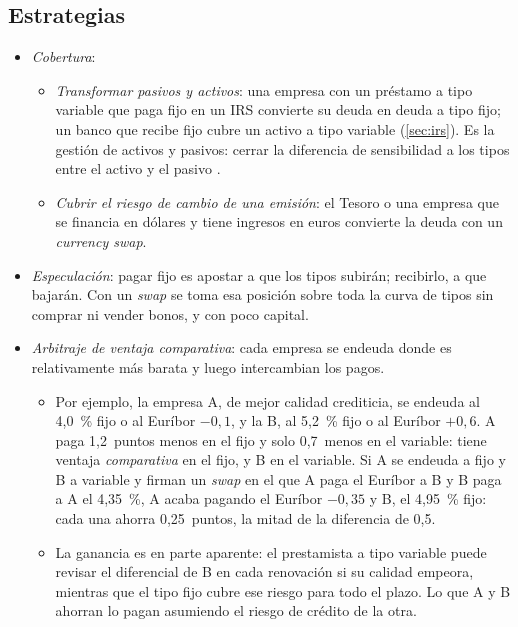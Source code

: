 \documentclass[11pt]{article}
\begin{document}
\subsection{Estrategias}\label{sec:estrategias-swaps}

\begin{itemize}
\item \emph{Cobertura}:
  \begin{itemize}
  \item \emph{Transformar pasivos y activos}: una empresa con un préstamo a tipo variable que paga fijo en un IRS convierte su deuda en deuda a tipo fijo; un banco que recibe fijo cubre un activo a tipo variable (\ref{sec:irs}). Es la gestión de activos y pasivos: cerrar la diferencia de sensibilidad a los tipos entre el activo y el pasivo .
  \item \emph{Cubrir el riesgo de cambio de una emisión}: el Tesoro o una empresa que se financia en dólares y tiene ingresos en euros convierte la deuda con un \emph{currency swap}.
  \end{itemize}
\item \emph{Especulación}: pagar fijo es apostar a que los tipos subirán; recibirlo, a que bajarán. Con un \emph{swap} se toma esa posición sobre toda la curva de tipos sin comprar ni vender bonos, y con poco capital.
\item \emph{Arbitraje de ventaja comparativa}: cada empresa se endeuda donde es relativamente más barata y luego intercambian los pagos\nocite{BickslerChen1986Economic}\nocite{Hull2022Options}.
  \begin{itemize}
  \item Por ejemplo, la empresa A, de mejor calidad crediticia, se endeuda al 4,0~\% fijo o al Euríbor $-0{,}1$, y la B, al 5,2~\% fijo o al Euríbor $+0{,}6$. A paga 1,2~puntos menos en el fijo y solo 0,7~menos en el variable: tiene ventaja \emph{comparativa} en el fijo, y B en el variable. Si A se endeuda a fijo y B a variable y firman un \emph{swap} en el que A paga el Euríbor a B y B paga a A el 4,35~\%, A acaba pagando el Euríbor $-0{,}35$ y B, el 4,95~\% fijo: cada una ahorra 0,25~puntos, la mitad de la diferencia de 0,5.
  \item La ganancia es en parte aparente: el prestamista a tipo variable puede revisar el diferencial de B en cada renovación si su calidad empeora, mientras que el tipo fijo cubre ese riesgo para todo el plazo. Lo que A y B ahorran lo pagan asumiendo el riesgo de crédito de la otra\nocite{Turnbull1987Swaps}.
  \end{itemize}
\end{itemize}
\end{document}
